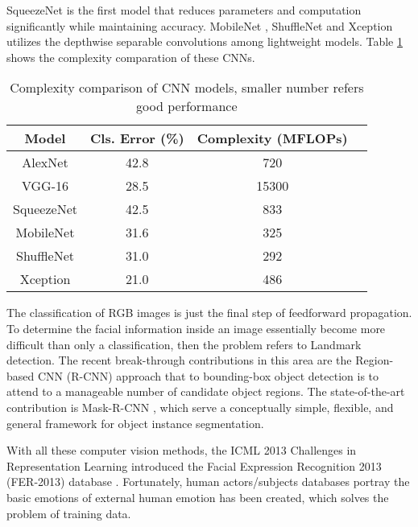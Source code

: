 SqueezeNet \cite{iandola2016squeezenet} is the first model that reduces parameters and computation significantly while maintaining accuracy. MobileNet \cite{howard2017mobilenets}, ShuffleNet \cite{zhang2017shufflenet} and Xception \cite{chollet2016xception} utilizes the depthwise separable convolutions among lightweight models. Table \ref{tab:cnn} shows the complexity comparation of these CNNs.

\begin{table}[htb]
  \caption{Complexity comparison of CNN models, smaller number refers good performance}
  \label{tab:cnn}
  \scriptsize
  \begin{center}
    \begin{tabular}{cccc}
      Model & Cls. Error (\%) &  Complexity (MFLOPs) \\
    \hline
    AlexNet\cite{Krizhevsky2012}                   & 42.8         &  720    \\
    VGG-16\cite{Simonyan2015}                    & 28.5         & 15300 \\
    SqueezeNet\cite{iandola2016squeezenet}                & 42.5         &  833    \\
    MobileNet\cite{howard2017mobilenets}                 & 31.6         &  325    \\
    ShuffleNet\cite{zhang2017shufflenet}                & 31.0         &  292    \\
    Xception\cite{chollet2016xception}                  & 21.0         &  486
    \end{tabular}
  \end{center}
\end{table}

The classification of RGB images is just the final step of feedforward propagation. To determine the facial information inside an image essentially become more difficult than only a classification, then the problem refers to Landmark detection.
The recent break-through contributions in this area are the Region-based CNN (R-CNN) approach \cite{girshick2014rich} that to bounding-box object detection is to attend to a manageable number of candidate object regions. The state-of-the-art contribution is Mask-R-CNN \cite{he2017mask}, which serve a conceptually simple, flexible, and general framework for object instance segmentation.

With all these computer vision methods, the ICML 2013 Challenges in Representation Learning introduced the Facial Expression Recognition 2013 (FER-2013)
database \cite{goodfellow2013challenges}. Fortunately, human actors/subjects databases portray the basic emotions of external human emotion has been created, which solves the problem of training data.

